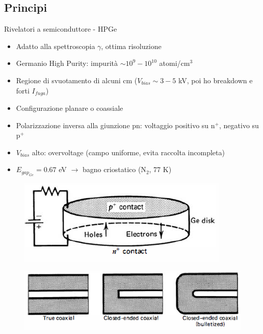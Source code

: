 \documentclass{beamer}
\begin{document}
\subsection{Principi}
\begin{frame}{Rivelatori a semiconduttore - HPGe}
    \begin{itemize}
        \item Adatto alla spettroscopia $\gamma$, ottima risoluzione
        \item Germanio High Purity: impurità $\sim 10^9-10^{10}$ atomi/cm$^3$
        \item Regione di svuotamento di alcuni cm ($V_{bias} \sim 3-5$ kV, poi ho breakdown e forti $I_{fuga}$)
        \item Configurazione planare o coassiale
        \item Polarizzazione inversa alla giunzione pn: voltaggio positivo su n$^+$, negativo su p$^+$
        \item $V_{bias}$ alto: overvoltage (campo uniforme, evita raccolta incompleta)
        \item $E_{gap_{Ge}} = 0.67$ eV $\to$ bagno criostatico (N$_2$, 77 K)
            \end{itemize}
        \begin{minipage}{\linewidth}
      \centering
      \begin{minipage}{0.45\linewidth}
          \begin{figure}[H]
              \includegraphics[width=\linewidth]{images/planare.PNG}
          \end{figure}
      \end{minipage}
      \hspace{0.05\linewidth}
      \begin{minipage}{0.45\linewidth}
          \begin{figure}[H]
              \includegraphics[width=\linewidth]{images/coaxial.PNG}
          \end{figure}
      \end{minipage}
  \end{minipage}
 
\end{frame}
\end{document}
